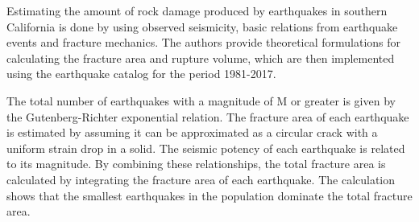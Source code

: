 \documentclass[12pt]{article} %
\theoremstyle{plain}
\begin{document}
	
	Estimating the amount of rock damage produced by earthquakes in southern California is done by using observed seismicity, basic relations from earthquake events and fracture mechanics. The authors provide theoretical formulations for calculating the fracture area and rupture volume, which are then implemented using the earthquake catalog for the period 1981-2017.
	
	The total number of earthquakes with a magnitude of M or greater is given by the Gutenberg-Richter exponential relation. The fracture area of each earthquake is estimated by assuming it can be approximated as a circular crack with a uniform strain drop in a solid. The seismic potency of each earthquake is related to its magnitude. By combining these relationships, the total fracture area is calculated by integrating the fracture area of each earthquake. The calculation shows that the smallest earthquakes in the population dominate the total fracture area.
	
\end{document}
